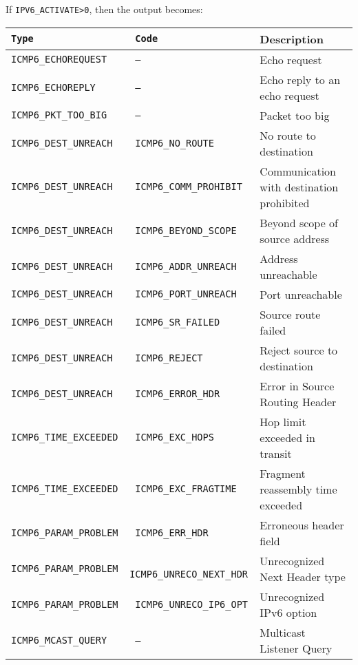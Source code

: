 \documentclass[documentation]{subfiles}
\begin{document}
If {\tt IPV6\_ACTIVATE>0}, then the output becomes:
\begin{longtable}{>{\tt}l>{\tt}ll}
    \toprule
    {\bf Type}               & {\bf Code}                          & {\bf Description}\\
    \midrule\endhead%
    ICMP6\_ECHOREQUEST       & ---                                 & Echo request \\
    ICMP6\_ECHOREPLY         & ---                                 & Echo reply to an echo request \\
    ICMP6\_PKT\_TOO\_BIG     & ---                                 & Packet too big\\
    ICMP6\_DEST\_UNREACH     & ICMP6\_NO\_ROUTE                    & No route to destination\\
    ICMP6\_DEST\_UNREACH     & ICMP6\_COMM\_PROHIBIT               & Communication with destination prohibited\\
    ICMP6\_DEST\_UNREACH     & ICMP6\_BEYOND\_SCOPE                & Beyond scope of source address\\
    ICMP6\_DEST\_UNREACH     & ICMP6\_ADDR\_UNREACH                & Address unreachable\\
    ICMP6\_DEST\_UNREACH     & ICMP6\_PORT\_UNREACH                & Port unreachable\\
    ICMP6\_DEST\_UNREACH     & ICMP6\_SR\_FAILED                   & Source route failed \\
    ICMP6\_DEST\_UNREACH     & ICMP6\_REJECT                       & Reject source to destination\\
    ICMP6\_DEST\_UNREACH     & ICMP6\_ERROR\_HDR                   & Error in Source Routing Header\\
    ICMP6\_TIME\_EXCEEDED    & ICMP6\_EXC\_HOPS                    & Hop limit exceeded in transit\\
    ICMP6\_TIME\_EXCEEDED    & ICMP6\_EXC\_FRAGTIME                & Fragment reassembly time exceeded\\
    ICMP6\_PARAM\_PROBLEM    & ICMP6\_ERR\_HDR                     & Erroneous header field\\
    ICMP6\_PARAM\_PROBLEM    & ICMP6\_UNRECO\_NEXT\_HDR            & Unrecognized Next Header type\\
    ICMP6\_PARAM\_PROBLEM    & ICMP6\_UNRECO\_IP6\_OPT             & Unrecognized IPv6 option\\
    ICMP6\_MCAST\_QUERY      & ---                                 & Multicast Listener Query\\

\end{longtable}
\end{document}

